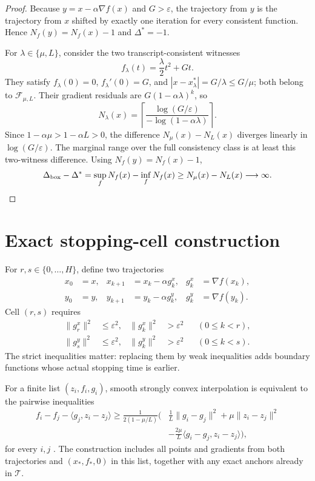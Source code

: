 \documentclass[smallextended]{svjour3}
\newcommand{\cF}{\mathcal{F}}
\newcommand{\cT}{\mathcal{T}}
\newcommand{\ip}[2]{\langle #1,#2\rangle}
\newcommand{\norm}[1]{\lVert #1\rVert}
\newcommand{\eps}{\varepsilon}
\begin{document}
\begin{proof}
Because $y=x-\alpha\nabla f(x)$ and $G>\eps$, the trajectory from $y$ is the
trajectory from $x$ shifted by exactly one iteration for every consistent
function.  Hence $N_f(y)=N_f(x)-1$ and $\Delta^*=-1$.

For $\lambda\in\{\mu,L\}$, consider the two transcript-consistent witnesses
\begin{equation}
 f_\lambda(t)=\frac{\lambda}{2}t^2+Gt.               \label{eq:gap-witness}
\end{equation}
They satisfy $f_\lambda(0)=0$, $f_\lambda'(0)=G$, and
$|x-x_\lambda^*|=G/\lambda\leq G/\mu$; both belong to
$\cF_{\mu,L}$.  Their gradient residuals are
$G(1-\alpha\lambda)^k$, so
\begin{equation}
 N_\lambda(x)=
 \left\lceil
 \frac{\log(G/\eps)}{-\log(1-\alpha\lambda)}
 \right\rceil.                                      \label{eq:gap-count}
\end{equation}
Since $1-\alpha\mu>1-\alpha L>0$, the difference
$N_\mu(x)-N_L(x)$ diverges linearly in $\log(G/\eps)$.  The marginal range
over the full consistency class is at least this two-witness difference.
Using $N_f(y)=N_f(x)-1$,
\[
 \Delta_{\rm box}-\Delta^*
 =\sup_f N_f(x)-\inf_f N_f(x)
 \geq N_\mu(x)-N_L(x)\longrightarrow\infty.
\]
\end{proof}

\section{Exact stopping-cell construction}
\label{sec:pep}

For $r,s\in\{0,\ldots,H\}$, define two trajectories
\begin{align}
 x_0&=x,&x_{k+1}&=x_k-\alpha g_k^x,&g_k^x&=\nabla f(x_k),\label{eq:xtraj}\\
 y_0&=y,&y_{k+1}&=y_k-\alpha g_k^y,&g_k^y&=\nabla f(y_k).\label{eq:ytraj}
\end{align}
Cell $(r,s)$ requires
\begin{align}
 \norm{g_r^x}^2&\leq\eps^2,&
 \norm{g_k^x}^2&>\eps^2&& (0\leq k<r),\label{eq:xstop}\\
 \norm{g_s^y}^2&\leq\eps^2,&
 \norm{g_k^y}^2&>\eps^2&& (0\leq k<s).\label{eq:ystop}
\end{align}
The strict inequalities matter: replacing them by weak inequalities adds
boundary functions whose actual stopping time is earlier.

For a finite list $(z_i,f_i,g_i)$, smooth strongly convex interpolation is
equivalent to the pairwise inequalities
\begin{align}
 f_i-f_j-\ip{g_j}{z_i-z_j}
 \geq \frac{1}{2(1-\mu/L)}\bigg(
 &\frac1L\norm{g_i-g_j}^2+\mu\norm{z_i-z_j}^2 \nonumber\\[-1mm]
 &-\frac{2\mu}{L}\ip{g_i-g_j}{z_i-z_j}\bigg),
 \label{eq:interpolation}
\end{align}
for every $i,j$ \citep{TaylorInterpolation2017}.  The construction includes all points and
gradients from both trajectories and $(x_*,f_*,0)$ in this list, together with
any exact anchors already in $\cT$.
\end{document}
